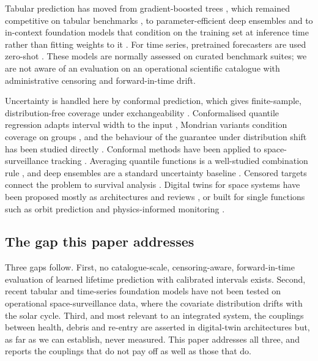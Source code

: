 \documentclass[3p,times]{elsarticle}
\begin{document}
Tabular prediction has moved from gradient-boosted trees
\citep{chen2016xgboost, ke2017lightgbm, prokhorenkova2018catboost},
which remained competitive on tabular benchmarks
\citep{grinsztajn2022tree}, to parameter-efficient deep ensembles
\citep{gorishniy2025tabm} and to in-context foundation models that
condition on the training set at inference time rather than fitting
weights to it
\citep{hollmann2025accurate, qu2025tabicl, qu2026tabiclv2, nvidia2026kumo}.
For time series, pretrained forecasters are used zero-shot
\citep{ansari2024chronos, ansari2025chronos2}. These models are normally
assessed on curated benchmark suites; we are not aware of an evaluation
on an operational scientific catalogue with administrative censoring and
forward-in-time drift.

Uncertainty is handled here by conformal prediction, which gives
finite-sample, distribution-free coverage under exchangeability
\citep{vovk2005algorithmic, angelopoulos2023gentle}. Conformalised
quantile regression adapts interval width to the input
\citep{romano2019cqr}, Mondrian variants condition coverage on groups
\citep{vovk2005algorithmic}, and the behaviour of the guarantee under
distribution shift has been studied directly
\citep{barber2023, candes2023conformalized, gibbs2021aci}. Conformal
methods have been applied to space-surveillance tracking
\citep{laxhammar2010conformal, laxhammar2015inductive}. Averaging
quantile functions is a well-studied combination rule
\citep{lichtendahl2013average}, and deep ensembles are a standard
uncertainty baseline \citep{lakshminarayanan2017ensembles}. Censored
targets connect the problem to survival analysis
\citep{harrell1982evaluating, barnwal2022survival}. Digital twins for
space systems have been proposed mostly as architectures and reviews
\citep{liu2024digital, guimaraes2023taxonomy}, or built for single
functions such as orbit prediction \citep{xu2025digital} and
physics-informed monitoring \citep{em2026physics}.

\subsection{The gap this paper
addresses}\label{the-gap-this-paper-addresses}

Three gaps follow. First, no catalogue-scale, censoring-aware,
forward-in-time evaluation of learned lifetime prediction with
calibrated intervals exists. Second, recent tabular and time-series
foundation models have not been tested on operational space-surveillance
data, where the covariate distribution drifts with the solar cycle.
Third, and most relevant to an integrated system, the couplings between
health, debris and re-entry are asserted in digital-twin architectures
but, as far as we can establish, never measured. This paper addresses
all three, and reports the couplings that do not pay off as well as
those that do.
\end{document}
